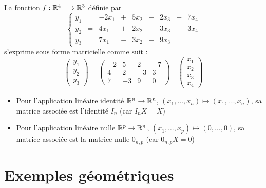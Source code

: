 \begin{frame}
\begin{exemple}
La fonction $f: \mathbb{R}^4 \longrightarrow \mathbb{R}^3$ définie par
$$\left\{\begin{array}{rcccccccc}
y_1 & = & -2x_1 &+& 5x_2 &+& 2x_3 &-& 7x_4\\
y_2 & = & 4x_1 &+& 2x_2 &-& 3x_3 &+& 3x_4\\
y_3 & = & 7x_1 &-& 3x_2 &+& 9x_3 && 
\end{array}\right.$$
s'exprime sous forme matricielle comme suit : 
$$\begin{pmatrix} y_1\\ y_2\\ y_3 \end{pmatrix} =
\begin{pmatrix}
-2 & 5 & 2 & -7\\
4 & 2 & -3 & 3\\
7 & -3 & 9 & 0  
\end{pmatrix}\quad
\begin{pmatrix}x_1\\ x_2\\ x_3\\ x_4 \end{pmatrix}$$
\end{exemple}
\end{frame}


\begin{frame}
\begin{exemple}
\begin{itemize}\setlength{\itemsep}{8pt}
  \item Pour l'application linéaire identité $\mathbb{R}^n \to \mathbb{R}^n$, $(x_1,\ldots,x_n) \mapsto (x_1,\ldots,x_n)$, sa matrice associée
  est l'identité $I_n$ (car $I_n X= X$)

  \pause
  
  \item Pour l'application linéaire nulle $\mathbb{R}^p \to \mathbb{R}^n$, $(x_1,\ldots,x_p) \mapsto (0,\ldots,0)$, sa matrice associée
  est la matrice nulle $0_{n,p}$ (car $0_{n,p} X= 0$)
\end{itemize}
\end{exemple}
\end{frame}


\section{Exemples géométriques}

